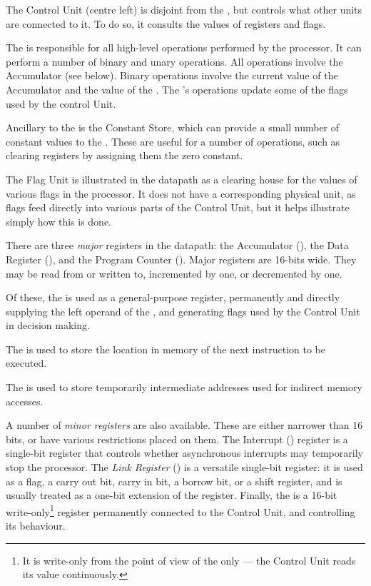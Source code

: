 The Control Unit (centre left) is disjoint from the \IBUS{}, but controls what
other units are connected to it. To do so, it consults the values of registers
and flags.

The \ALU{} is responsible for all high-level operations performed by
the processor. It can perform a number of binary and unary
operations. All operations involve the \gls{Accumulator} (see below). Binary
operations involve the current value of the \gls{Accumulator} and the value
of the \IBUS{}. The \ALU's operations update some of the flags used by
the control Unit.

Ancillary to the \ALU{} is the Constant Store, which can provide a small
number of constant values to the \IBUS{}. These are useful for a number of
operations, such as clearing registers by assigning them the zero constant.

The Flag Unit is illustrated in the datapath as a clearing house for the values
of various flags in the processor. It does not have a corresponding physical
unit, as flags feed directly into various parts of the Control Unit, but it
helps illustrate simply how this is done.

There are three {\em major\/} registers in the datapath: the \gls{Accumulator} (\A),
the Data Register (\DR), and the Program Counter (\PC). Major registers are
16-bits wide. They may be read from or written to, incremented by one, or
decremented by one.

Of these, the \A{} is used as a general-purpose register, permanently and
directly supplying the left operand of the \ALU, and generating flags
used by the Control Unit in decision making.

The \PC{} is used to store the location in memory of the next instruction to be
executed.

The \DR{} is used to store temporarily intermediate addresses used for indirect
memory accesses.

A number of {\em minor registers} are also available. These are either narrower
than 16 bits, or have various restrictions placed on them. The Interrupt
(\Ireg{}) register is a single-bit register that controls whether asynchronous
interrupts may temporarily stop the processor. The {\em Link Register} (\Lreg)
is a versatile single-bit register: it is used as a flag, a carry out bit,
carry in bit, a borrow bit, or a shift register, and is usually treated as a
one-bit extension of the \A{} register. Finally, the \IR{} is a 16-bit
write-only\footnote{It is write-only from the point of view of the \IBUS{} only
  — the Control Unit reads its value continuously.} register permanently
connected to the Control Unit, and controlling its behaviour.

